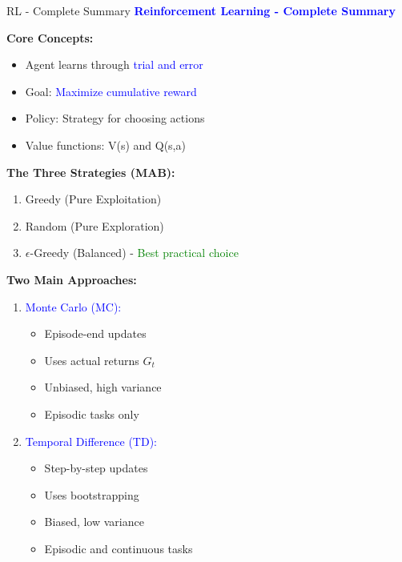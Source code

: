 \documentclass[8pt]{beamer}
\begin{document}
	\begin{frame}{RL - Complete Summary}
		\fontsize{6.5}{7.5}\selectfont
		\textcolor{blue}{\textbf{Reinforcement Learning - Complete Summary}}
		
		\textbf{Core Concepts:}
		\begin{itemize}
			\item Agent learns through \textcolor{blue}{trial and error}
			\item Goal: \textcolor{blue}{Maximize cumulative reward}
			\item Policy: Strategy for choosing actions
			\item Value functions: V(s) and Q(s,a)
		\end{itemize}
		
		\textbf{The Three Strategies (MAB):}
		\begin{enumerate}
			\item Greedy (Pure Exploitation)
			\item Random (Pure Exploration)
			\item $\epsilon$-Greedy (Balanced) - \textcolor{green}{Best practical choice}
		\end{enumerate}
		
		\textbf{Two Main Approaches:}
		\begin{enumerate}
			\item \textcolor{blue}{Monte Carlo (MC):}
			\begin{itemize}
				\item Episode-end updates
				\item Uses actual returns $G_t$
				\item Unbiased, high variance
				\item Episodic tasks only
			\end{itemize}
			\item \textcolor{blue}{Temporal Difference (TD):}
			\begin{itemize}
				\item Step-by-step updates
				\item Uses bootstrapping
				\item Biased, low variance
				\item Episodic and continuous tasks
			\end{itemize}
		\end{enumerate}
		

\end{frame}
\end{document}
